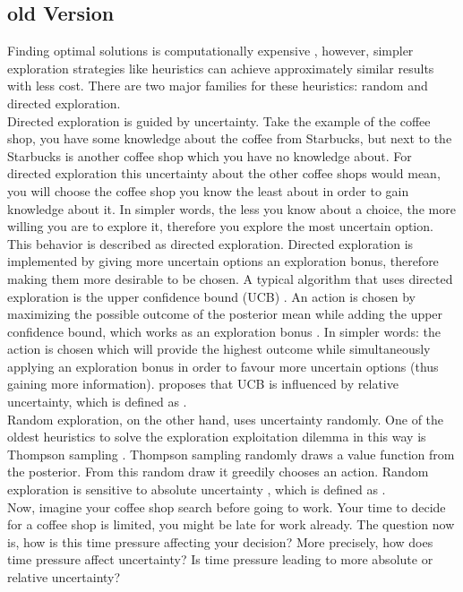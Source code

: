 \subsection{old Version}
Finding optimal solutions is computationally expensive \citep{gittins1979bandit}, however, simpler exploration strategies like heuristics can achieve approximately similar results with less cost. There are two major families for these heuristics: random and directed exploration.\\ 
Directed exploration is guided by uncertainty. Take the example of the coffee shop, you have some knowledge about the coffee from Starbucks, but next to the Starbucks is another coffee shop which you have no knowledge about. For directed exploration this uncertainty about the other coffee shops would mean, you will choose the coffee shop you know the least about in order to gain knowledge about it. In simpler words, the less you know about a choice, the more willing you are to explore it, therefore you explore the most uncertain option. This behavior is described as directed exploration.
Directed exploration is implemented by giving more uncertain options an exploration bonus, therefore making them more desirable to be chosen. A typical algorithm that uses directed exploration is the upper confidence bound (UCB) \citep{auer2002finite}. An action is chosen by maximizing the possible outcome of the posterior mean while adding the upper confidence bound, which works as an exploration bonus \citep{srinivas2009gaussian}. In simpler words: the action is chosen which will provide the highest outcome while simultaneously applying an exploration bonus in order to favour more uncertain options (thus gaining more information). \cite{gershman2018deconstructing} proposes that UCB is influenced by relative uncertainty, which is defined as  \citep{gershman2018uncertainty}.\\
Random exploration, on the other hand, uses uncertainty randomly. One of the oldest heuristics to solve the exploration exploitation dilemma in this way is Thompson sampling \citep{thompson1933likelihood}. Thompson sampling randomly draws a value function from the posterior. From this random draw it greedily chooses an action. Random exploration is sensitive to  absolute uncertainty \citep{gershman2018deconstructing}, which is defined as \citep{gershman2018uncertainty}.\\
Now, imagine your coffee shop search before going to work. Your time to decide for a coffee shop is limited, you might be late for work already. The question now is, how is this time pressure affecting your decision? More precisely, how does time pressure affect uncertainty? Is time pressure leading to more absolute or relative uncertainty? 
